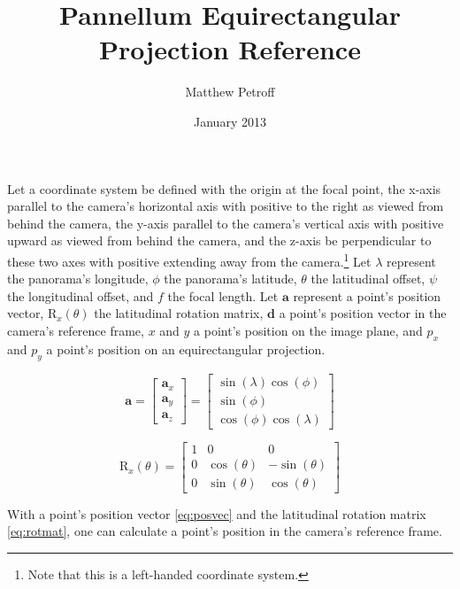 \documentclass[letterpaper,10pt]{article}
\begin{document}
\title{Pannellum Equirectangular Projection Reference}
\author{Matthew Petroff}
\date{January 2013}
\maketitle 

Let a coordinate system be defined with the origin at the focal point, the
x-axis parallel to the camera's horizontal axis with positive to the right as
viewed from behind the camera, the y-axis parallel to the camera's vertical
axis with positive upward as viewed from behind the camera, and the z-axis be
perpendicular to these two axes with positive extending away from the
camera.\footnote{Note that this is a left-handed coordinate system.}
Let \(\lambda\) represent the panorama's longitude, \(\phi\) the panorama's
latitude, \(\theta\) the latitudinal offset, \(\psi\) the longitudinal offset,
and \(f\) the focal length. Let \(\mathbf{a}\) represent a point's position
vector, \(\mathrm{R}_x(\theta)\) the latitudinal rotation matrix,
\(\mathbf{d}\) a point's position vector in the camera's reference frame, \(x\)
and \(y\) a point's position on the image plane, and \(p_x\) and \(p_y\) a
point's position on an equirectangular projection.

\begin{equation} \label{eq:posvec}
\mathbf{a} = \begin{bmatrix}
\mathbf{a}_x \\ \mathbf{a}_y \\ \mathbf{a}_z
\end{bmatrix} = \begin{bmatrix}
\sin(\lambda)\cos(\phi) \\ \sin(\phi) \\ \cos(\phi)\cos(\lambda) \end{bmatrix}
\end{equation}

\begin{equation}  \label{eq:rotmat}
\mathrm{R}_x(\theta) = \begin{bmatrix}
1 & 0 & 0 \\
0 & \cos(\theta) & -\sin(\theta) \\
0 & \sin(\theta) & \cos(\theta)
\end{bmatrix}
\end{equation}

With a point's position vector \eqref{eq:posvec} and the latitudinal rotation
matrix \eqref{eq:rotmat}, one can calculate a point's position in the camera's
reference frame.\nopagebreak
\end{document}
